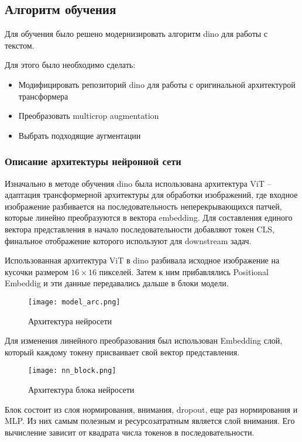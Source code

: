 \documentclass[../part_2.tex]{subfiles}
\begin{document}
    \subsection{Алгоритм обучения}
    \par Для обучения было решено модернизировать алгоритм dino для работы с текстом.
    \par Для этого было необходимо сделать:
    \begin{itemize}
        \item Модифицировать репозиторий \acrshort{dino} для работы с оригинальной архитектурой трансформера
        \item Преобразовать multicrop augmentation
        \item Выбрать подходящие аугментации
    \end{itemize}
    \subsubsection{Описание архитектуры нейронной сети}
    \par Изначально в методе обучения \acrshort{dino} была использована архитектура ViT -- адаптация трансформерной архитектуры для обработки изображений, где входное изображение разбивается на последовательность неперекрывающихся патчей, которые линейно преобразуются в вектора  embedding. Для составления единого вектора представления в начало последовательности добавляют токен CLS, финальное отображение которого используют для downstream задач. 
    \par Использованная архитектура ViT в \acrshort{dino} разбивала исходное изображение на кусочки размером $16\times16$ пикселей. Затем к ним прибавлялись Positional Embeddig и эти данные передавались дальше в блоки модели.
    \begin{figure}[H]
        \centering
        \texttt{[image: model\_arc.png]}
        \caption{Архитектура нейросети}
        \label{fig:model_arc}
    \end{figure}
    \par Для изменения линейного преобразования был использован Embedding слой, который каждому токену присваивает свой вектор представления.
    \begin{figure}[H]
        \centering
        \texttt{[image: nn\_block.png]}
        \caption{Архитектура блока нейросети}
        \label{fig:nn_block}
    \end{figure}
    \par Блок состоит из слоя нормирования, внимания, dropout, еще раз нормирования и MLP. Из них самым полезным и ресурсозатратным является слой внимания. Его вычисление зависит от квадрата числа токенов в последовательности.
\end{document}
